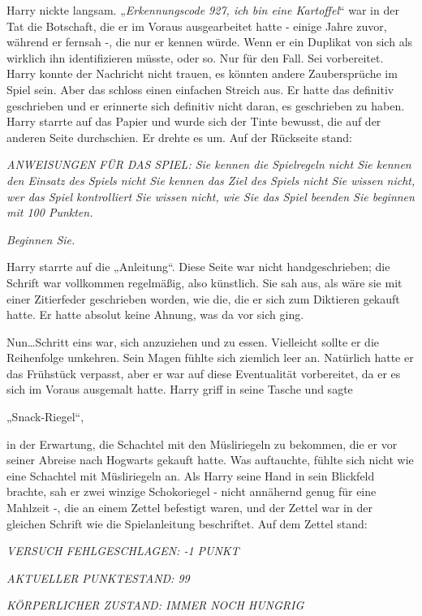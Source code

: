 {Harry nickte langsam. „\emph{Erkennungscode 927, ich bin eine Kartoffel}“ war in der Tat die Botschaft, die er im Voraus ausgearbeitet hatte - einige Jahre zuvor, während er fernsah -, die nur er kennen würde. Wenn er ein Duplikat von sich als wirklich ihn identifizieren müsste, oder so. Nur für den Fall. Sei vorbereitet. Harry konnte der Nachricht nicht trauen, es könnten andere Zaubersprüche im Spiel sein. Aber das schloss einen einfachen Streich aus. Er hatte das definitiv geschrieben und er erinnerte sich definitiv nicht daran, es geschrieben zu haben. Harry starrte auf das Papier und wurde sich der Tinte bewusst, die auf der anderen Seite durchschien. Er drehte es um. Auf der Rückseite stand:

\emph{ANWEISUNGEN FÜR DAS SPIEL: Sie kennen die Spielregeln nicht Sie kennen den Einsatz des Spiels nicht Sie kennen das Ziel des Spiels nicht Sie wissen nicht, wer das Spiel kontrolliert Sie wissen nicht, wie Sie das Spiel beenden Sie beginnen mit 100 Punkten.}

\emph{Beginnen Sie.}

Harry starrte auf die „Anleitung“. Diese Seite war nicht handgeschrieben; die Schrift war vollkommen regelmäßig, also künstlich. Sie sah aus, als wäre sie mit einer Zitierfeder geschrieben worden, wie die, die er sich zum Diktieren gekauft hatte. Er hatte absolut keine Ahnung, was da vor sich ging.

Nun…Schritt eins war, sich anzuziehen und zu essen. Vielleicht sollte er die Reihenfolge umkehren. Sein Magen fühlte sich ziemlich leer an. Natürlich hatte er das Frühstück verpasst, aber er war auf diese Eventualität vorbereitet, da er es sich im Voraus ausgemalt hatte. Harry griff in seine Tasche und sagte

„Snack-Riegel“,

in der Erwartung, die Schachtel mit den Müsliriegeln zu bekommen, die er vor seiner Abreise nach Hogwarts gekauft hatte. Was auftauchte, fühlte sich nicht wie eine Schachtel mit Müsliriegeln an. Als Harry seine Hand in sein Blickfeld brachte, sah er zwei winzige Schokoriegel - nicht annähernd genug für eine Mahlzeit -, die an einem Zettel befestigt waren, und der Zettel war in der gleichen Schrift wie die Spielanleitung beschriftet. Auf dem Zettel stand:

\emph{VERSUCH FEHLGESCHLAGEN: -1 PUNKT}

\emph{AKTUELLER PUNKTESTAND: 99}

\emph{KÖRPERLICHER ZUSTAND: IMMER NOCH HUNGRIG}

}
